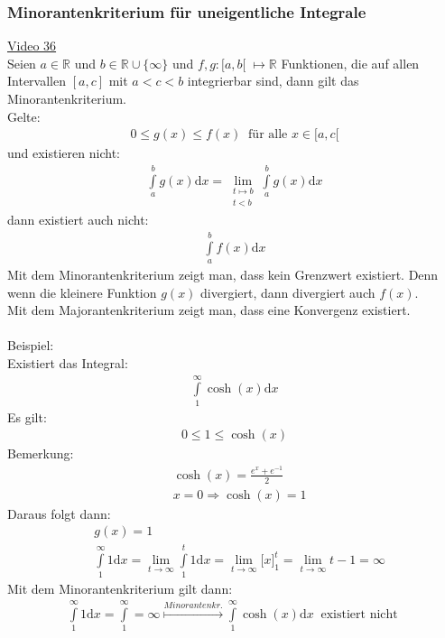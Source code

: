 \subsubsection{Minorantenkriterium für uneigentliche Integrale}
\href{https://youtu.be/wBYcVF1449w}{Video 36}\\
Seien $ a\in\mathbb{R} $ und $ b\in\mathbb{R}\cup\{\infty\} $ und $ f,g:[a,b[\;\longmapsto \mathbb{R} $ Funktionen, die auf allen Intervallen $ [a,c] $ mit $ a<c<b $ integrierbar sind, dann gilt das Minorantenkriterium.\\
Gelte:\\
\begin{align*}
0\leq g(x) \leq f(x)\;\;\text{für alle } x\in[a,c[
\end{align*}
und existieren nicht:\\
\begin{align*}
\int\limits_{a}^{b} g(x)\mathrm{d}x=\lim\limits_ {\substack{t\mapsto b \\ t<b}}\int\limits_{a}^{b} g(x)\mathrm{d}x
\end{align*}
dann existiert auch nicht:
\begin{align*}
\int\limits_{a}^{b} f(x)\mathrm{d}x
\end{align*}
Mit dem Minorantenkriterium zeigt man, dass kein Grenzwert existiert. Denn wenn die kleinere Funktion $ g(x) $ divergiert, dann divergiert auch $ f(x) $.\\
Mit dem Majorantenkriterium zeigt man, dass eine Konvergenz existiert.\\
\\
Beispiel:\\
Existiert das Integral:\\
\begin{align*}
\int\limits_{1}^{\infty} \cosh(x)\mathrm{d}x
\end{align*}
Es gilt:\\
\begin{align*}
0\leq 1 \leq \cosh(x)
\end{align*}
Bemerkung:\\
\begin{align*}
&\cosh(x)=\frac{e^x+e^{-1}}{2}\\
&x=0\Rightarrow \cosh(x)=1
\end{align*}
Daraus folgt dann:\\
\begin{align*}
&g(x)=1\\
&\int\limits_{1}^{\infty} 1\mathrm{d}x=\lim\limits_ {t\to\infty}\int\limits_{1}^{t} 1\mathrm{d}x=\lim\limits_ {t\to\infty}\bigg[x\bigg]^t_1=\lim\limits_ {t\to\infty} t-1=\infty
\end{align*}
Mit dem Minorantenkriterium gilt dann:\\
\begin{align*}
\int\limits_{1}^{\infty} 1\mathrm{d}x=\int\limits_{1}^{\infty} =\infty\overset{Minorantenkr.}{\longmapsto}\int\limits_{1}^{\infty} \cosh(x)\mathrm{d}x\;\;\text{existiert nicht }
\end{align*}

